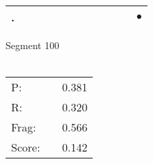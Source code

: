 \documentclass[landscape]{article}
\newcommand{\ssp}{\hspace{2pt}}
\newcommand{\mex}{\cellcolor{g}$\bullet$}
\begin{document}
\begin{tabular}{|l|p{10pt}|p{10pt}|p{10pt}|p{10pt}|p{10pt}|p{10pt}|p{10pt}|p{10pt}|p{10pt}|p{10pt}|p{10pt}|}
\hline
\ssp \cellcolor{ref10}. \ssp&\hspace{2pt}&\hspace{2pt}&\hspace{2pt}&\hspace{2pt}&\hspace{2pt}&\hspace{2pt}&\hspace{2pt}&\hspace{2pt}&\hspace{2pt}&\hspace{2pt}&\hspace{2pt}\mex\\
\hline
\end{tabular}

\vspace{6pt}
\noindent Segment 100\\\\
\noindent\begin{tabular}{lm{12pt}r}
\hline
P:&&0.381\\
R:&&0.320\\
Frag:&&0.566\\
Score:&&0.142\\
\end{tabular}

\newpage
\end{document}
